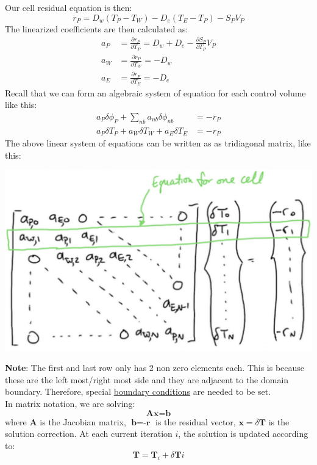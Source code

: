 \documentclass[11pt]{article}
\begin{document}
Our cell residual equation is then:
\begin{equation}
r_P = D_w (T_P-T_W)-D_e(T_E-T_P)-S_PV_P
\end{equation}
The linearized coefficients are then calculated as:
\begin{align}
a_P &= \frac{\partial r_P}{\partial T_P} = D_w + D_e - \frac{\partial S_P}{\partial T_P}V_P\\
a_W &= \frac{\partial r_P}{\partial T_W} = -D_w\\
a_E &= \frac{\partial r_P}{\partial T_E} = -D_e
\end{align}
Recall that we can form an algebraic system of equation for each control volume like this:
\begin{align}
a_P\delta \phi_P + \sum_{nb} a_{nb}\delta \phi_{nb} &= -r_P\\
a_P\delta T_P + a_W\delta T_W + a_E \delta T_E &= -r_P 
\end{align}
The above linear system of equations can be written as as tridiagonal matrix, like this:
\begin{center}
\includegraphics[scale=0.2]{pic/heat1D_tridiagonal.png}
\end{center}
\textbf{Note}: The first and last row only has 2 non zero elements each. This is because these are the left most/right most side and they are
adjacent to the domain boundary. Therefore, special \uline{boundary conditions} are needed to be set. \\
In matrix notation, we are solving:
\begin{equation}
\textbf{A}\textbf{x} = \textbf{b}  
\end{equation}
where \(\textbf{A}\) is the Jacobian matrix, \(\textbf{b} = \textbf{-r}\) is the residual vector, \(\textbf{x} = \delta \textbf{T}\)
is the solution correction. At each current iteration \(i\), the solution is updated according to:
\begin{equation}
\textbf{T} = \textbf{T}_i + \delta \textbf{T}i
\end{equation}
\end{document}
